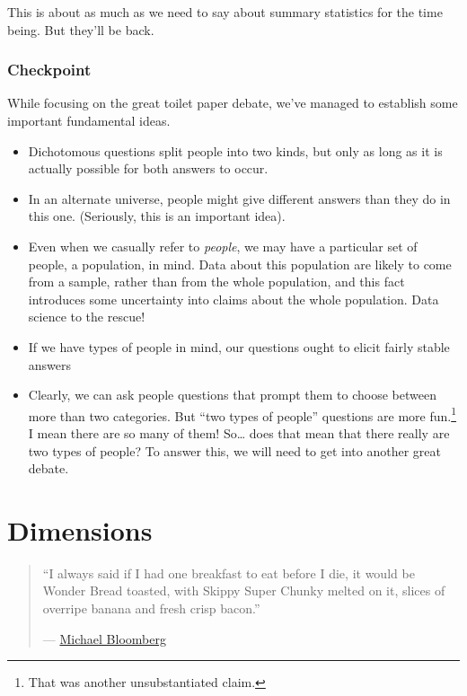 \documentclass[
  openany]{book}
\begin{document}
This is about as much as we need to say about summary statistics for the time being. But they'll be back.

\hypertarget{checkpoint}{%
\subsection*{Checkpoint}\label{checkpoint}}

While focusing on the great toilet paper debate, we've managed to establish some important fundamental ideas.

\begin{itemize}
\item
  Dichotomous questions split people into two kinds, but only as long as it is actually possible for both answers to occur.
\item
  In an alternate universe, people might give different answers than they do in this one. (Seriously, this is an important idea).
\item
  Even when we casually refer to \emph{people}, we may have a particular set of people, a population, in mind. Data about this population are likely to come from a sample, rather than from the whole population, and this fact introduces some uncertainty into claims about the whole population. Data science to the rescue!
\item
  If we have types of people in mind, our questions ought to elicit fairly stable answers
\item
  Clearly, we can ask people questions that prompt them to choose between more than two categories. But ``two types of people'' questions are more fun.\footnote{That was another unsubstantiated claim.} I mean there are so many of them! So\ldots{} does that mean that there really are two types of people? To answer this, we will need to get into another great debate.
\end{itemize}

\hypertarget{dimensions}{%
\chapter{Dimensions}\label{dimensions}}

\begin{quote}
``I always said if I had one breakfast to eat before I die, it would be Wonder Bread toasted, with Skippy Super Chunky melted on it, slices of overripe banana and fresh crisp bacon.''

--- \href{https://nypost.com/2008/07/26/mayors-last-meal-is-a-killer/}{Michael Bloomberg}
\end{quote}
\end{document}
